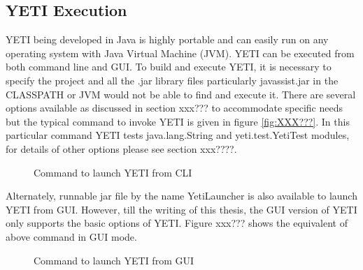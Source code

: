 \subsection{YETI Execution}
YETI being developed in Java is highly portable and can easily run on any operating system with Java Virtual Machine (JVM). YETI can be executed from both command line and GUI. To build and execute YETI, it is necessary to specify the project and all the .jar library files particularly javassist.jar in the CLASSPATH or JVM would not be able to find and execute it. There are several options available as discussed in section xxx??? to accommodate specific needs but the typical command to invoke YETI is given in figure \ref{fig:XXX???}. In this particular command YETI tests java.lang.String and yeti.test.YetiTest modules, for details of other options please see section xxx????. 

\begin{figure}[h]
	\centering
	\caption{Command to launch YETI from CLI}
\end{figure}

Alternately, runnable jar file by the name YetiLauncher is also available to launch YETI from GUI. However, till the writing of this thesis, the GUI version of YETI only supports the basic options of YETI. Figure xxx??? shows the equivalent of above command in GUI mode.

\begin{figure}[h]
	\centering
	\caption{Command to launch YETI from GUI}
\end{figure}


